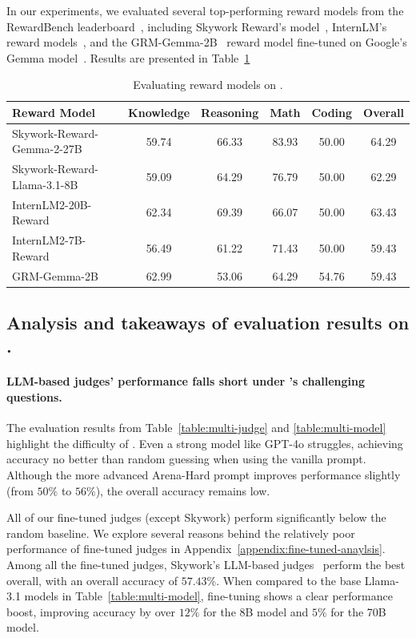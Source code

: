 \documentclass{article} %
\begin{document}
In our experiments, we evaluated several top-performing reward models from the RewardBench leaderboard~\citep{lambert2024rewardbench}, including Skywork Reward's model~\citep{skyworkreward2024}, InternLM's reward models~\citep{cai2024internlm2}, and the GRM-Gemma-2B~\citep{yang2024grm} reward model fine-tuned on Google's Gemma model~\citep{team2024gemma}. Results are presented in Table~\ref{table:reward-models}

\begin{table}[h]
\centering
\begin{tabular}{lccccc}
\toprule
Reward Model & Knowledge & Reasoning & Math & Coding & Overall \\ \midrule
Skywork-Reward-Gemma-2-27B & 59.74 & 66.33 & 83.93 & 50.00 & 64.29 \\
Skywork-Reward-Llama-3.1-8B & 59.09 & 64.29 & 76.79	& 50.00 & 62.29  \\
InternLM2-20B-Reward & 62.34 & 69.39 & 66.07 & 50.00 & 63.43 \\
InternLM2-7B-Reward  & 56.49 & 61.22 & 71.43 & 50.00 & 59.43 \\
GRM-Gemma-2B  & 62.99 & 53.06 & 64.29 & 54.76 & 59.43 \\
\bottomrule
\end{tabular}
\caption{Evaluating reward models on \sys.}
\label{table:reward-models}
\end{table}

\subsection{Analysis and takeaways of evaluation results on \sys.}
\label{sec:eval-analysis}

\paragraph{LLM-based judges' performance falls short under \sys's challenging questions.} The evaluation results from Table~\ref{table:multi-judge} and \ref{table:multi-model} highlight the difficulty of \sys. Even a strong model like GPT-4o struggles, achieving accuracy no better than random guessing when using the vanilla prompt. Although the more advanced Arena-Hard prompt improves performance slightly (from $50\%$ to $56\%$), the overall accuracy remains low. 

All of our fine-tuned judges (except Skywork) perform significantly below the random baseline. We explore several reasons behind the relatively poor performance of fine-tuned judges in Appendix~\ref{appendix:fine-tuned-anaylsis}. Among all the fine-tuned judges, Skywork's LLM-based judges~\citep{skyworkcritic2024} perform the best overall, with an overall accuracy of $57.43\%$. When compared to the base Llama-3.1 models in Table~\ref{table:multi-model}, fine-tuning shows a clear performance boost, improving accuracy by over $12\%$ for the 8B model and $5\%$ for the 70B model.
\end{document}
